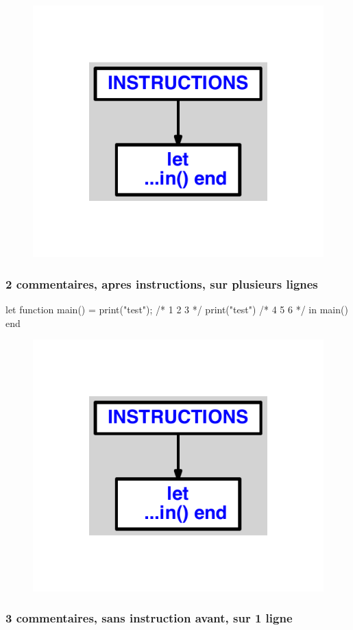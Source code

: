 \documentclass{article}
\begin{document}
\begin{figure}[H]\centering\includegraphics[max width=\textwidth]{ast/ast_156.pdf}\end{figure}\subsubsection{2 commentaires, apres instructions, sur plusieurs lignes}
\begin{verbatimtab}
let
	function main() =
		print("test");
		/*
		1
		2
		3
		*/
		print("test")
		/*
		4
		5
		6
		*/
in main() end
\end{verbatimtab}
\begin{figure}[H]\centering\includegraphics[max width=\textwidth]{ast/ast_157.pdf}\end{figure}\subsubsection{3 commentaires, sans instruction avant, sur 1 ligne}
\end{document}
